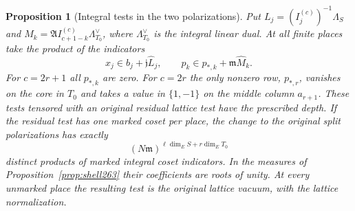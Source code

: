 \documentclass[a4paper,11pt]{article}
\newtheorem{proposition}{Proposition}[section]
\theoremstyle{definition}
\theoremstyle{remark}
\numberwithin{equation}{section}
\begin{document}
\begin{proposition}[Integral tests in the two polarizations]\leavevmode
\label{prop:positions264}
Put \(L_j=(I_j^{(c)})^{-1}\Lambda_S\) and
\(M_k=\mathfrak A I_{c+1-k}^{(c)}\Lambda_{T_0}^{\vee}\), where
\(\Lambda_{T_0}^{\vee}\) is the integral linear dual. At all finite
places take the product of the indicators
\[
  x_j\in b_j+\mathfrak j\widehat L_j,\qquad
  p_k\in p_{*,k}+\mathfrak m\widehat M_k .
\]
For \(c=2r+1\) all \(p_{*,k}\) are zero. For \(c=2r\) the only
nonzero row, \(p_{*,r}\), vanishes on the core in \(T_0\) and
takes a value in \(\{1,-1\}\) on the middle column \(a_{r+1}\).
These tests tensored with an original residual lattice test have
the prescribed depth. If the residual test has one marked
coset per place, the change to the original split polarizations
has exactly
\[
              (N\mathfrak m)^{\ell\dim_E S+r\dim_E T_0}
\]
distinct products of marked integral coset indicators. In the
measures of Proposition~\ref{prop:shell263} their coefficients
are roots of unity. At every unmarked place the resulting test
is the original lattice vacuum, with the lattice normalization.
\end{proposition}
\end{document}
